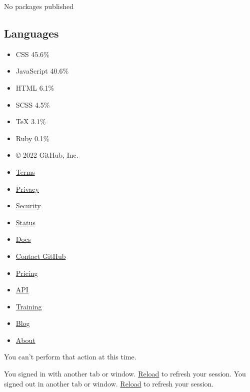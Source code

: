 \documentclass[english,]{article}
\providecommand{\tightlist}{%
  \setlength{\itemsep}{0pt}\setlength{\parskip}{0pt}}
\begin{document}
No packages published\\

\hypertarget{languages}{%
\subsection{Languages}\label{languages}}

{ {} {} {} {} {} {} }

\begin{itemize}
\tightlist
\item
  {CSS} {45.6\%}
\item
  {JavaScript} {40.6\%}
\item
  {HTML} {6.1\%}
\item
  {SCSS} {4.5\%}
\item
  {TeX} {3.1\%}
\item
  {Ruby} {0.1\%}
\end{itemize}

\begin{itemize}
\tightlist
\item
  { © 2022 GitHub, Inc. }
\end{itemize}

\begin{itemize}
\tightlist
\item
  \href{https://docs.github.com/en/github/site-policy/github-terms-of-service}{Terms}
\item
  \href{https://docs.github.com/en/github/site-policy/github-privacy-statement}{Privacy}
\item
  \href{https://github.com/security}{Security}
\item
  \href{https://www.githubstatus.com/}{Status}
\item
  \href{https://docs.github.com}{Docs}
\item
  \href{https://support.github.com?tags=dotcom-footer}{Contact GitHub}
\item
  \href{https://github.com/pricing}{Pricing}
\item
  \href{https://docs.github.com}{API}
\item
  \href{https://services.github.com}{Training}
\item
  \href{https://github.blog}{Blog}
\item
  \href{https://github.com/about}{About}
\end{itemize}

{}

\hypertarget{ajax-error-message}{}
You can't perform that action at this time.

{You signed in with another tab or window. \href{}{Reload} to refresh
your session.} {You signed out in another tab or window. \href{}{Reload}
to refresh your session.}
\end{document}
